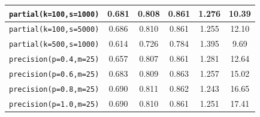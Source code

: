 \begin{table}[]
{\begin{tabular}{|c|c|c|c|c|c|}
\texttt{partial(k=100,s=1000)} & 0.681 & 0.808 & 0.861 & 1.276 & 10.39 \\ \hline
\texttt{partial(k=100,s=5000)} & 0.686 & 0.810 & 0.861 & 1.255 & 12.10 \\ \hline
\texttt{partial(k=500,s=1000)} & 0.614 & 0.726 & 0.784 & 1.395 & 9.69 \\ \hline
\hline
\texttt{precision(p=0.4,m=25)} & 0.657 & 0.807 & 0.861 & 1.281 & 12.64 \\ \hline
\texttt{precision(p=0.6,m=25)} & 0.683 & 0.809 & 0.863 & 1.257 & 15.02 \\ \hline
\texttt{precision(p=0.8,m=25)} & 0.690 & 0.811 & 0.862 & 1.243 & 16.65 \\ \hline
\texttt{precision(p=1.0,m=25)} & 0.690 & 0.810 & 0.861 & 1.251 & 17.41 \\ \hline
\end{tabular}
}
\end{table}

